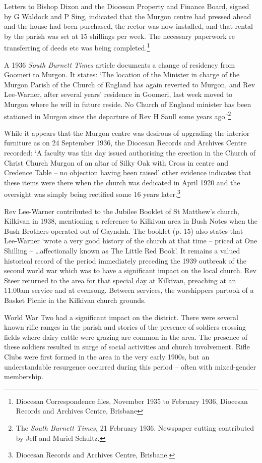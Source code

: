 Letters to Bishop Dixon and the Diocesan Property and Finance Board,
signed by G Waldock and P Sing, indicated that the Murgon centre had
pressed ahead and the house had been purchased, the rector was now
installed, and that rental by the parish was set at 15 shillings per
week. The necessary paperwork re transferring of deeds etc was being
completed.\footnote{Diocesan Correspondence files, November 1935 to
  February 1936, Diocesan Records and Archives Centre, Brisbane}

A 1936 \emph{South Burnett Times} article documents a change of
residency from Goomeri to Murgon. It states: `The location of the
Minister in charge of the Murgon Parish of the Church of England has
again reverted to Murgon, and Rev Lee-Warner, after several years'
residence in Goomeri, last week moved to Murgon where he will in future
reside. No Church of England minister has been stationed in Murgon since
the departure of Rev H Saull some years ago.'\footnote{The \emph{South
  Burnett Times,} 21 February 1936. Newspaper cutting contributed by
  Jeff and Muriel Schultz.}

While it appears that the Murgon centre was desirous of upgrading the
interior furniture as on 24 September 1936, the Diocesan Records and
Archives Centre recorded: `A faculty was this day issued authorising the
erection in the Church of Christ Church Murgon of an altar of Silky Oak
with Cross in centre and Credence Table -- no objection having been
raised' other evidence indicates that these items were there when the
church was dedicated in April 1920 and the oversight was simply being
rectified some 16 years later.\footnote{Diocesan Records and Archives
  Centre, Brisbane.}

Rev Lee-Warner contributed to the Jubilee Booklet of St Matthew's
church, Kilkivan in 1938, mentioning a reference to Kilkivan area in
Bush Notes when the Bush Brothers operated out of Gayndah. The booklet
(p. 15) also states that Lee-Warner `wrote a very good history of the
church at that time -- priced at One Shilling -- \ldots affectionally
known as The Little Red Book'. It remains a valued historical record of
the period immediately preceding the 1939 outbreak of the second world
war which was to have a significant impact on the local church. Rev
Steer returned to the area for that special day at Kilkivan, preaching
at an 11.00am service and at evensong. Between services, the worshippers
partook of a Basket Picnic in the Kilkivan church grounds.

World War Two had a significant impact on the district. There were
several known rifle ranges in the parish and stories of the presence of
soldiers crossing fields where dairy cattle were grazing are common in
the area. The presence of these soldiers resulted in surge of social
activities and church involvement. Rifle Clubs were first formed in the
area in the very early 1900s, but an understandable resurgence occurred
during this period -- often with mixed-gender membership.


